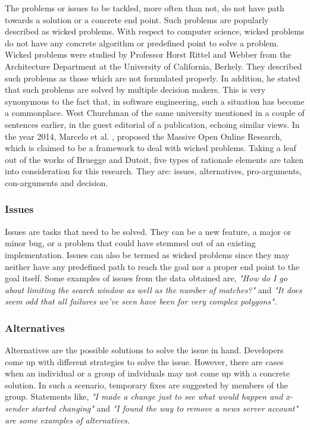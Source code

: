 \documentclass[a4paper,12pt,twoside]{report}
\begin{document}
The problems or issues to be tackled, more often than not, do not have path towards a solution or a concrete end point. Such problems are popularly described as wicked problems. With respect to computer science, wicked problems do not have any concrete algorithm or predefined point to solve a problem. Wicked problems were studied by Professor Horst Rittel and Webber \cite{Rittel1973} from the Architecture Department at the University of California, Berkely. They described such problems as those which are not formulated properly. In addition, he stated that such problems are solved by multiple decision makers. This is very synonymous to the fact that, in software engineering, such a situation has become a commonplace. West Churchman \cite{InstituteofManagementSciences.1967} of the same university mentioned in a couple of sentences earlier, in the guest editorial of a publication, echoing similar views. In the year 2014, Marcelo et al. \cite{Machado2014}, proposed the Massive Open Online Research, which is claimed to be a framework to deal with wicked problems. 
\bigbreak
Taking a leaf out of the works of Bruegge and Dutoit\cite{Bruegge2009}, five types of rationale elements are taken into consideration for this research. They are: issues, alternatives, pro-arguments, con-arguments and decision.
 
\subsubsection{Issues}
Issues are tasks that need to be solved. They can be a new feature, a major or minor bug, or a problem that could have stemmed out of an existing implementation. Issues can also be termed as wicked problems \cite{Rittel1973} since they may neither have any predefined path to reach the goal nor a proper end point to the goal itself. Some examples of issues from the data obtained are, \textit{"How do I go about limiting the search window as well as the number of matches?"} and \textit{"It does seem odd that all failures we've seen have been for very complex polygons".}  

\subsubsection{Alternatives}
Alternatives are the possible solutions to solve the issue in hand. Developers come up with different strategies to solve the issue. However, there are cases when an individual or a group of indviduals may not come up with a concrete solution. In such a scenario, temporary fixes are suggested by members of the group. Statements like, \textit{"I made a change just to see what would happen and x-sender started changing"} and \textit{"I found the way to remove a news server account" are some examples of alternatives.}
\end{document}
